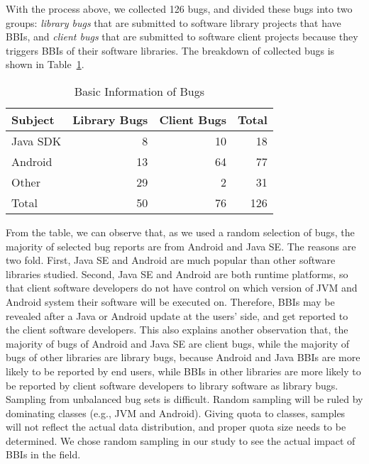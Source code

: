 With the process above, we collected 126 bugs, and divided these bugs into two groups: \textit{library bugs} that are submitted to software library projects that have BBIs, and \textit{client bugs} that are submitted to software client projects because they triggers BBIs of their software libraries. The breakdown of collected bugs is shown in Table~\ref{table:basicbug}.

\begin{table}
	\center
	\caption{\label{table:basicbug} Basic Information of Bugs}
				
	\begin{tabular}{|l|r|r|r|}
		\hline
		Subject & Library Bugs& Client Bugs & Total\\ 
		\hline
		Java SDK &        8      &     10   & 18   \\
		Android &         13     &     64   & 77  \\
		Other   &         29     &    2    & 31  \\
		\hline
			Total   & 50             &  76     & 126     \\
		\hline
	\end{tabular}
	\vspace{+0.3cm}			
\end{table}

From the table, we can observe that, as we used a random selection of bugs, the majority of selected bug reports are from Android and Java SE. The reasons are two fold. First, Java SE and Android are much popular than other software libraries studied. Second, Java SE and Android are both runtime platforms, so that client software developers do not have control on which version of JVM and Android system their software will be executed on. Therefore, BBIs may be revealed after a Java or Android update at the users' side, and get reported to the client software developers. This also explains another observation that, the majority of bugs of Android and Java SE are client bugs, while the majority of bugs of other libraries are library bugs, because Android and Java BBIs are more likely to be reported by end users, while BBIs in other libraries are more likely to be reported by client software developers to library software as library bugs. Sampling from unbalanced bug sets is difficult. Random sampling will be ruled by dominating classes (e.g., JVM and Android). Giving quota to classes, samples will not reflect the actual data distribution, and proper quota size needs to be determined. We chose random sampling in our study to see the actual impact of BBIs in the field. 

